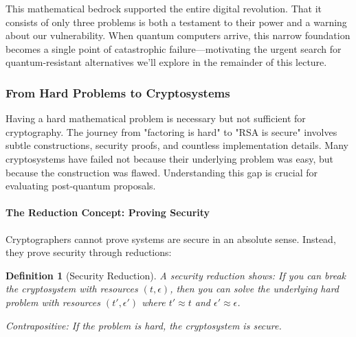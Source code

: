 \documentclass[11pt,a4paper]{article}
\newtheorem{definition}{Definition}
\begin{document}
This mathematical bedrock supported the entire digital revolution. That it consists of only three problems is both a testament to their power and a warning about our vulnerability. When quantum computers arrive, this narrow foundation becomes a single point of catastrophic failure---motivating the urgent search for quantum-resistant alternatives we'll explore in the remainder of this lecture.

\subsubsection{From Hard Problems to Cryptosystems}

Having a hard mathematical problem is necessary but not sufficient for cryptography. The journey from "factoring is hard" to "RSA is secure" involves subtle constructions, security proofs, and countless implementation details. Many cryptosystems have failed not because their underlying problem was easy, but because the construction was flawed. Understanding this gap is crucial for evaluating post-quantum proposals.

\paragraph{The Reduction Concept: Proving Security}

Cryptographers cannot prove systems are secure in an absolute sense. Instead, they prove security through reductions:

\begin{definition}[Security Reduction]
A security reduction shows: If you can break the cryptosystem with resources $(t, \epsilon)$, then you can solve the underlying hard problem with resources $(t', \epsilon')$ where $t' \approx t$ and $\epsilon' \approx \epsilon$.

Contrapositive: If the problem is hard, the cryptosystem is secure.
\end{definition}
\end{document}
